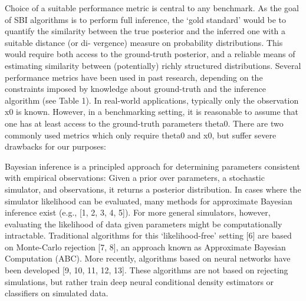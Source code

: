 Choice of a suitable performance metric is central to any benchmark. As the goal of SBI algorithms is to perform full inference, the ‘gold standard’ would be to quantify the similarity between the true posterior and the inferred one with a suitable distance (or di- vergence) measure on probability distributions. This would require both access to the ground-truth posterior, and a reliable means of estimating similarity between (potentially) richly structured distributions. Several performance metrics have been used in past research, depending on the constraints imposed by knowledge about ground-truth and the inference algorithm (see Table 1). In real-world applications, typically only the observation x0 is known. However, in a benchmarking setting, it is reasonable to assume that one has at least access to the ground-truth parameters theta0. There are two commonly used metrics which only require theta0 and
x0, but suffer severe drawbacks for our purposes:


Bayesian inference is a principled approach for determining parameters consistent with empirical observations: Given a prior over parameters, a stochastic simulator, and observations, it returns a posterior distribution. In cases where the simulator likelihood can be evaluated, many methods for approximate Bayesian
inference exist (e.g., [1, 2, 3, 4, 5]). For more general simulators, however, evaluating the likelihood of data
given parameters might be computationally intractable. Traditional algorithms for this ‘likelihood-free’
setting [6] are based on Monte-Carlo rejection [7, 8], an approach known as Approximate Bayesian Computation (ABC). More recently, algorithms based on neural networks have been developed [9, 10, 11, 12, 13].
These algorithms are not based on rejecting simulations, but rather train deep neural conditional density estimators or classifiers on simulated data. 
